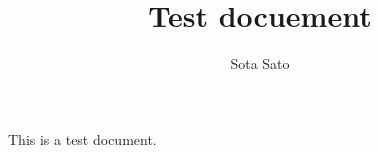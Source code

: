 \documentclass[a4paper]{article}
\begin{document}
\title{Test docuement}
\author{Sota Sato}

\maketitle

This is a test document.



\end{document}
